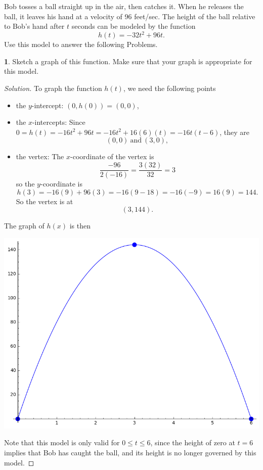 \documentclass[12pt]{amsart}
\theoremstyle{definition}
\newtheorem{thm}{}
\begin{document}
\newpage
Bob tosses a ball straight up in the air, then catches it.
When he releases the ball, it leaves his hand at a velocity of 96 feet/sec.
The height of the ball relative to Bob's hand after $t$ seconds can be modeled by the function
$$h(t) = -32t^2 + 96t.$$
Use this model to answer the following Problems.
\begin{thm}\label{problem: kinematics graph}
  Sketch a graph of this function.
  Make sure that your graph is appropriate for this model.
\end{thm}
\begin{proof}[Solution]
  To graph the function $h(t)$, we need the following points
  \begin{itemize}
  \item
    the $y$-intercept: $(0,h(0)) = (0,0)$,
  \item
    the $x$-intercepts:
    Since $0 = h(t) = -16t^2 +96t = -16t^2 + 16(6)(t)= -16t(t - 6)$, they are
    $$(0,0)\ \text{and}\ (3,0),$$
  \item
    the vertex:
    The $x$-coordinate of the vertex is
    $$\frac{-96}{2(-16)} = \frac{3(32)}{32} = 3$$
    so the $y$-coordinate is
    $$h(3) = -16(9) + 96(3) = -16(9 - 18) = -16(-9) = 16(9) = 144.$$
    So the vertex is at
    $$(3,144).$$
  \end{itemize}
  The graph of $h(x)$ is then
  \begin{center}
    \includegraphics[scale=0.5]{kinematics}
  \end{center}
  Note that this model is only valid for $0 \leq t \leq 6$, since the height of zero at $t = 6$ implies that Bob has caught the ball, and its height is no longer governed by this model.
\end{proof}
\newpage
\end{document}
